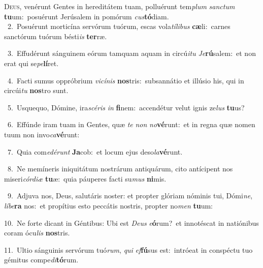 \lettrine{\initial\textcolor{\initialcolor}{D}}{eus,} venérunt Gentes in hereditátem tuam, polluérunt tem\textit{plum} \textit{sanc}\-\textit{tum} \textbf{tu}\-um:~\star posuérunt Jerúsalem in pomórum \textit{cus}\-\textbf{tó}diam.\\
{\numbfont\textcolor{\numbcolor}{~2.}}~Posuérunt morticína servórum tuórum, escas vola\-\textit{tí}\-\textit{li}\textit{bus} \textbf{cæ}\-li:~\star carnes sanctórum tuórum bésti\textit{is} \textbf{ter}\-ræ.\par
{\numbfont\textcolor{\numbcolor}{~3.}}~Effudérunt sánguinem eórum tamquam aquam in circú\-\textit{i}\-\textit{tu} \textit{Je}\-\textbf{rú}salem:~\star et non erat qui se\-\textit{pe}\-\textbf{lí}ret.\par
{\numbfont\textcolor{\numbcolor}{~4.}}~Facti sumus oppróbrium \textit{vi}\-\textit{cí}\textit{nis} \textbf{nos}\-tris:~\star subsannátio et illúsio his, qui in circúi\textit{tu} \textbf{nos}\-tro sunt.\par
{\numbfont\textcolor{\numbcolor}{~5.}}~Usquequo, Dómine, ira\-\textit{scé}\-\textit{ris} \textit{in} \textbf{fi}\-nem:~\star accendétur velut ignis ze\textit{lus} \textbf{tu}\-us?\par
{\numbfont\textcolor{\numbcolor}{~6.}}~Effúnde iram tuam in Gentes, quæ \textit{te} \textit{non} \textit{no}\-\textbf{vé}runt:~\star et in regna quæ nomen tuum non invo\-\textit{ca}\-\textbf{vé}runt:\par
{\numbfont\textcolor{\numbcolor}{~7.}}~Quia com\-\textit{e}\-\textit{dé}\textit{runt} \textbf{Ja}\-cob:~\star et locum ejus deso\-\textit{la}\-\textbf{vé}runt.\par
{\numbfont\textcolor{\numbcolor}{~8.}}~Ne memíneris iniquitátum nostrárum antiquárum, cito antícipent nos miseri\-\textit{cór}\-\textit{di}\textit{æ} \textbf{tu}\-æ:~\star quia páuperes facti su\textit{mus} \textbf{ni}\-mis.\par
{\numbfont\textcolor{\numbcolor}{~9.}}~Adjuva nos, Deus, salutáris noster: et propter glóriam nóminis tui, Dómi\-\textit{ne}\-, \textit{lí}\-\textit{be}\textbf{ra} nos:~\star et propítius esto peccátis nostris, propter no\textit{men} \textbf{tu}\-um:\par
{\numbfont\textcolor{\numbcolor}{10.}}~Ne forte dicant in Géntibus: Ubi est \textit{De}\-\textit{us} \textit{e}\-\textbf{ó}rum?~\star et innotéscat in natiónibus coram ócu\textit{lis} \textbf{nos}\-tris.\par
{\numbfont\textcolor{\numbcolor}{11.}}~Ultio sánguinis servórum tuó\-\textit{rum}\-, \textit{qui} \textit{ef}\-\textbf{fú}sus est:~\star intróeat in conspéctu tuo gémitus compe\-\textit{di}\-\textbf{tó}rum.\par
